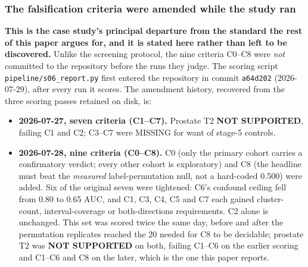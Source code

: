 \documentclass[11pt,a4paper]{article}
\begin{document}
\subsubsection*{The falsification criteria were amended while the study ran}

\textbf{This is the case study's principal departure from the standard the rest of
this paper argues for, and it is stated here rather than left to be discovered.}
Unlike the screening protocol, the nine criteria C0--C8 were \emph{not} committed to
the repository before the runs they judge. The scoring script
\texttt{pipeline/s06\_report.py} first entered the repository in commit
\texttt{a64d202} (2026-07-29), after every run it scores. The amendment history,
recovered from the three scoring passes retained on disk, is:

\begin{itemize}\itemsep2pt
\item \textbf{2026-07-27, seven criteria (C1--C7).} Prostate T2 \textbf{NOT
SUPPORTED}, failing C1 and C2; C3--C7 were MISSING for want of stage-5 controls.
\item \textbf{2026-07-28, nine criteria (C0--C8).} C0 (only the primary cohort
carries a confirmatory verdict; every other cohort is exploratory) and C8 (the
headline must beat the \emph{measured} label-permutation null, not a hard-coded
0.500) were added. Six of the original seven were tightened: C6's confound ceiling
fell from 0.80 to 0.65 AUC, and C1, C3, C4, C5 and C7 each gained cluster-count,
interval-coverage or both-directions requirements. C2 alone is unchanged. This set was
scored twice the same day, before and after the permutation replicates reached the 20
needed for C8 to be decidable; prostate T2 was \textbf{NOT SUPPORTED} on both, failing
C1--C6 on the earlier scoring and C1--C6 and C8 on the later, which is the one this
paper reports.
\end{itemize}
\end{document}
